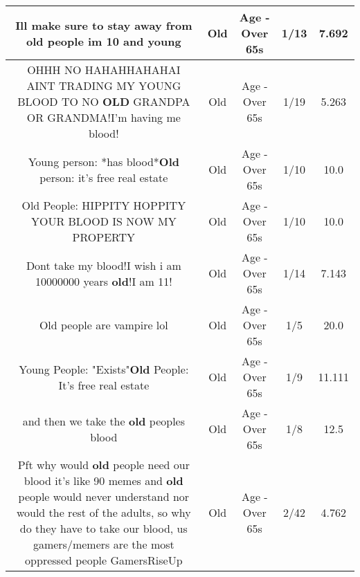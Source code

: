 \documentclass[11pt]{article}
\newlength\mylength
\begin{document}
\begin{center}
\begin{longtable}{|C{.65\mylength}|C{.30\mylength}|C{.12\mylength}|C{.12\mylength}|C{.12\mylength}|}
  \small Ill make sure to stay away from \textbf{old} people im 10 and young\normalsize   & Old & Age - Over 65s & 1/13 & 7.692 \\  \hline
  \small OHHH NO HAHAHHAHAHAI AINT TRADING MY YOUNG BLOOD TO NO \textbf{OLD} GRANDPA OR GRANDMA!I'm having me blood!\normalsize   & Old & Age - Over 65s & 1/19 & 5.263 \\  \hline
  \small Young person: *has blood*\textbf{Old} person: it's free real estate\normalsize   & Old & Age - Over 65s & 1/10 & 10.0 \\  \hline
  \small Old People: HIPPITY HOPPITY YOUR BLOOD IS NOW MY PROPERTY\normalsize   & Old & Age - Over 65s & 1/10 & 10.0 \\  \hline
  \small Dont take my blood!I wish i am 10000000 years \textbf{old}!I am 11!\normalsize   & Old & Age - Over 65s & 1/14 & 7.143 \\  \hline
  \small Old people are vampire lol\normalsize   & Old & Age - Over 65s & 1/5 & 20.0 \\  \hline
  \small Young People: "Exists"\textbf{Old} People: It's free real estate\normalsize   & Old & Age - Over 65s & 1/9 & 11.111 \\  \hline
  \small and then we take the \textbf{old} peoples blood\normalsize   & Old & Age - Over 65s & 1/8 & 12.5 \\  \hline
  \small Pft why would \textbf{old} people need our blood it's like 90 memes and \textbf{old} people would never understand nor would the rest of the adults, so why do they have to take our blood, us gamers/memers are the most oppressed people GamersRiseUp\normalsize   & Old & Age - Over 65s & 2/42 & 4.762 \\  \hline

\end{longtable}
\end{center}
\end{document}

